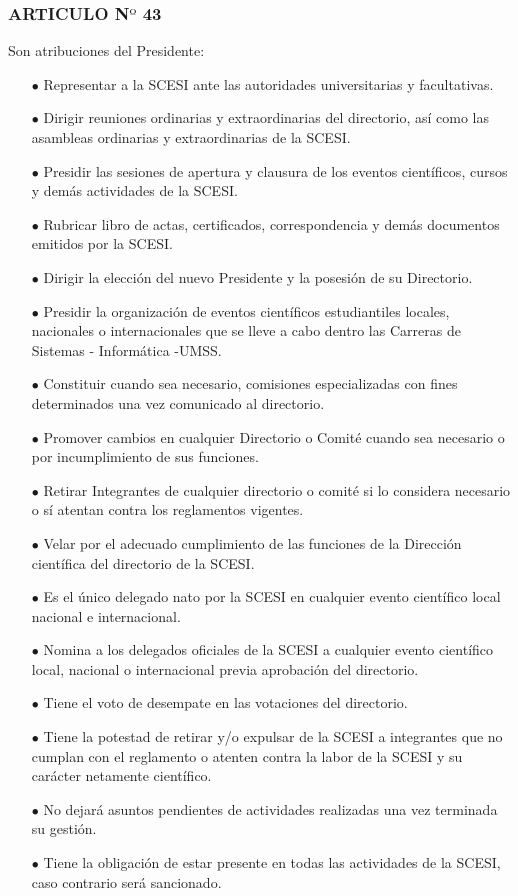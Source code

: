 \documentclass[11pt,letterpaper]{book}
\begin{document}
\begin{itemize}
\subsubsection*{ARTICULO N$º$ 43}
Son atribuciones del Presidente:
\begin{itemize}
\item[$\bullet$] Representar a la SCESI ante las autoridades universitarias y facultativas. 
\item[$\bullet$] Dirigir reuniones ordinarias y extraordinarias del directorio, así como las asambleas ordinarias y extraordinarias de la SCESI. 
\item[$\bullet$] Presidir las sesiones de apertura y clausura de los eventos científicos, cursos y demás actividades de la SCESI.
\item[$\bullet$] Rubricar libro de actas, certificados, correspondencia y demás documentos emitidos por la SCESI.
\item[$\bullet$] Dirigir la elección del nuevo Presidente y la posesión de su Directorio.
\item[$\bullet$] Presidir la organización de eventos científicos estudiantiles locales, nacionales o internacionales que se lleve a cabo dentro las Carreras de Sistemas - Informática -UMSS.
\item[$\bullet$] Constituir cuando sea necesario, comisiones especializadas con fines determinados una vez comunicado al directorio. 
\item[$\bullet$] Promover cambios en cualquier Directorio o Comité cuando sea necesario o por incumplimiento de sus funciones.
\item[$\bullet$] Retirar Integrantes de cualquier directorio o comité si lo considera necesario o sí atentan contra los reglamentos vigentes.
\item[$\bullet$] Velar por el adecuado cumplimiento de las funciones de la Dirección científica del directorio de la SCESI.
\item[$\bullet$] Es el único delegado nato por la SCESI en cualquier evento científico local nacional e internacional.
\item[$\bullet$] Nomina a los delegados oficiales de la SCESI a cualquier evento científico local, nacional o internacional previa aprobación del directorio. 
\item[$\bullet$] Tiene el voto de desempate en las votaciones del directorio.
\item[$\bullet$] Tiene la potestad de retirar y/o expulsar de la SCESI a integrantes que no cumplan con el reglamento o atenten contra la labor de la SCESI y su carácter netamente científico.
\item[$\bullet$] No dejará asuntos pendientes de actividades realizadas una vez terminada su gestión.
\item[$\bullet$] Tiene la obligación de estar presente en todas las actividades de la SCESI, caso contrario será sancionado.
\end{itemize}


\end{itemize}
\end{document}
